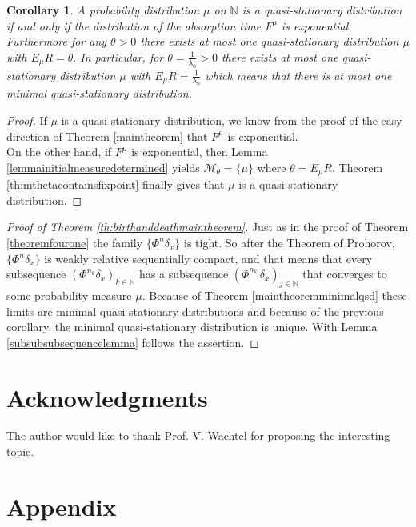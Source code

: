 \documentclass[12pt,a4paper]{scrartcl}
\newtheorem{corollary}[theorem]{Corollary}
\numberwithin{equation}{section}
\newcommand{\N}{\mathbb{N}} %
\begin{document}
\begin{corollary}
A probability distribution $\mu$ on $\N$ is a quasi-stationary distribution if and only if the distribution of the absorption time $F^{\mu}$ is exponential. Furthermore for any $\theta > 0$ there exists at most one quasi-stationary distribution $\mu$ with $E_{\mu} R = \theta. $ In particular, for $\theta = \frac{1}{\lambda_0} > 0$ there exists at most one quasi-stationary distribution $\mu$ with $E_{\mu} R = \frac{1}{\lambda_0}$ which means that there is at most one minimal quasi-stationary distribution.
\end{corollary}
\begin{proof}
If $\mu$ is a quasi-stationary distribution, we know from the proof of the easy direction of Theorem \ref{maintheorem} that $F^{\mu}$ is exponential.\\
On the other hand, if $F^{\mu}$ is exponential, then Lemma \ref{lemmainitialmeasuredetermined} yields $\mathcal{M}_{\theta} = \lbrace \mu \rbrace$ where $\theta = E_{\mu} R$. Theorem \ref{th:mthetacontainsfixpoint} finally gives that $\mu$ is a quasi-stationary distribution. 
\end{proof}

\begin{proof} [Proof of Theorem \ref{th:birthanddeathmaintheorem}]
Just as in the proof of Theorem \ref{theoremfourone} the family $\lbrace \Phi^n \delta_x \rbrace$ is tight. So after the Theorem of Prohorov, $\lbrace \Phi^n \delta_x \rbrace$ is weakly relative sequentially compact, and that means that every subsequence $\left(\Phi^{n_k} \delta_x \right)_{k \in \N}$ has a subsequence $\left(\Phi^{n_{k_j}} \delta_x \right)_{j \in \N}$ that converges to some probability measure $\mu.$ Because of Theorem \ref{maintheoremminimalqsd} these limits are minimal quasi-stationary distributions and because of the previous corollary, the minimal quasi-stationary distribution is unique. With Lemma \ref{subsubsubsequencelemma} follows the assertion.
\end{proof}

\section{Acknowledgments}
The author would like to thank Prof. V. Wachtel for proposing the interesting topic.

\appendix

\section{Appendix}
\end{document}
